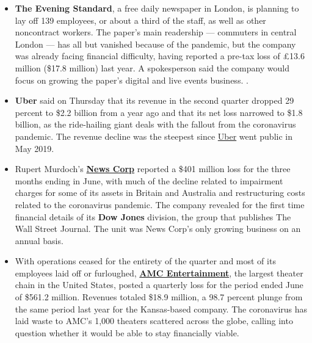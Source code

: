 \begin{itemize}
\item
  \textbf{The Evening Standard}, a free daily newspaper in London, is
  planning to lay off 139 employees, or about a third of the staff, as
  well as other noncontract workers. The paper's main readership ---
  commuters in central London --- has all but vanished because of the
  pandemic, but the company was already facing financial difficulty,
  having reported a pre-tax loss of £13.6 million (\$17.8 million) last
  year. A spokesperson said the company would focus on growing the
  paper's digital and live events business. .
\item
  \textbf{Uber} said on Thursday that its revenue in the second quarter
  dropped 29 percent to \$2.2 billion from a year ago and that its net
  loss narrowed to \$1.8 billion, as the ride-hailing giant deals with
  the fallout from the coronavirus pandemic. The revenue decline was the
  steepest since
  \href{https://www.nytimes.com/live/2020/08/06/business/stock-market-today-coronavirus/uber-reports-steep-revenue-decline-as-delivery-outpaces-ride-hailing}{Uber}
  went public in May 2019.
\item
  Rupert Murdoch's
  \textbf{\href{https://www.nytimes.com/live/2020/08/06/business/stock-market-today-coronavirus/dow-jones-was-news-corps-only-growing-division-this-past-fiscal-year}{News
  Corp}} reported a \$401 million loss for the three months ending in
  June, with much of the decline related to impairment charges for some
  of its assets in Britain and Australia and restructuring costs related
  to the coronavirus pandemic. The company revealed for the first time
  financial details of its \textbf{Dow Jones} division, the group that
  publishes The Wall Street Journal. The unit was News Corp's only
  growing business on an annual basis.
\item
  With operations ceased for the entirety of the quarter and most of its
  employees laid off or furloughed,
  \textbf{\href{https://www.nytimes.com/live/2020/08/06/business/stock-market-today-coronavirus/amcs-quarterly-revenues-dropped-98-7-percent-from-last-year}{AMC
  Entertainment}}, the largest theater chain in the United States,
  posted a quarterly loss for the period ended June of \$561.2 million.
  Revenues totaled \$18.9 million, a 98.7 percent plunge from the same
  period last year for the Kansas-based company. The coronavirus has
  laid waste to AMC's 1,000 theaters scattered across the globe, calling
  into question whether it would be able to stay financially viable.

\end{itemize}
